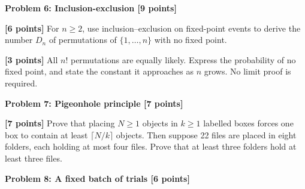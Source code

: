 \documentclass[12pt,letterpaper]{article}
\newcommand{\problemheading}[2][5\baselineskip]{\Needspace{#1}\par\noindent\hspace*{-0.625in}\textbf{#2}\par\nobreak\vspace{0.3em}}
\newcommand{\examspace}[1]{\par\vspace*{#1cm}}
\begin{document}
\clearpage
\vspace*{0.21in}
\problemheading{Problem 6: Inclusion-exclusion [9 points]}
\begin{list}{}{\setlength{\leftmargin}{0.25in}\setlength{\rightmargin}{0.25in}}\item[]
\begin{description}[font=\normalfont,leftmargin=1.2em,labelsep=0.4em]
\item[(a)] \textbf{[6 points]} For $n\ge2$, use inclusion--exclusion on fixed-point events to derive the number $D_n$ of permutations of $\{1,\ldots,n\}$ with no fixed point.
\examspace{5}
\Needspace{\dimexpr 3cm+4\baselineskip\relax}
\item[(b)] \textbf{[3 points]} All $n!$ permutations are equally likely. Express the probability of no fixed point, and state the constant it approaches as $n$ grows. No limit proof is required.
\examspace{3}
\end{description}
\end{list}
\clearpage
\vspace*{0.21in}
\problemheading{Problem 7: Pigeonhole principle [7 points]}
\begin{list}{}{\setlength{\leftmargin}{0.25in}\setlength{\rightmargin}{0.25in}}\item[]
\begin{description}[font=\normalfont,leftmargin=1.2em,labelsep=0.4em]
\item[] \textbf{[7 points]} Prove that placing $N\ge1$ objects in $k\ge1$ labelled boxes forces one box to contain at least $\lceil N/k\rceil$ objects. Then suppose 22 files are placed in eight folders, each holding at most four files. Prove that at least three folders hold at least three files.
\examspace{7}
\end{description}
\end{list}
\clearpage
\vspace*{0.21in}
\problemheading{Problem 8: A fixed batch of trials [6 points]}
\end{document}
